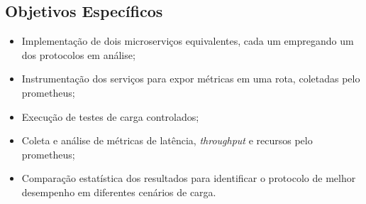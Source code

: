 \subsection{Objetivos Específicos}
\begin{itemize}
    \item Implementação de dois microserviços equivalentes, cada um empregando um dos protocolos em análise; 
    
    \item Instrumentação dos serviços para expor métricas em uma rota, coletadas pelo prometheus; 
    
    \item Execução de testes de carga controlados; 
    
    \item Coleta e análise de métricas de latência,  \textit{throughput} e recursos pelo prometheus; 

    \item Comparação estatística dos resultados para identificar o protocolo de melhor desempenho em diferentes cenários de carga.     

\end{itemize}











